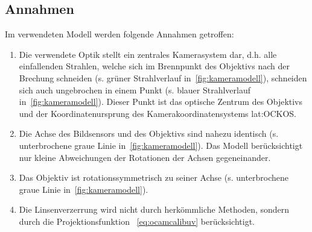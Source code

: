\subsection{Annahmen}
Im verwendeten Modell werden folgende Annahmen getroffen:
\begin{enumerate}
\item Die verwendete Optik stellt ein zentrales Kamerasystem dar, d.h. alle einfallenden Strahlen, welche sich im Brennpunkt des Objektivs nach der Brechung schneiden (s. grüner Strahlverlauf in~\ref{fig:kameramodell}), schneiden sich auch ungebrochen in einem Punkt (s. blauer Strahlverlauf in~\ref{fig:kameramodell}). Dieser Punkt ist das optische Zentrum des Objektivs und der Koordinatenursprung des Kamerakoordinatensystems \gls{lat:OCKOS}.
\item \label{item:ocamcalibassm2} Die Achse des Bildsensors und des Objektivs sind nahezu identisch (s. unterbrochene graue Linie in~\ref{fig:kameramodell}). Das Modell berücksichtigt nur kleine Abweichungen der Rotationen der Achsen gegeneinander.
\item Das Objektiv ist rotationssymmetrisch zu seiner Achse (s. unterbrochene graue Linie in~\ref{fig:kameramodell}).
\item Die Linsenverzerrung wird nicht durch herkömmliche Methoden, sondern durch die Projektionsfunktion ~\eqref{eq:ocamcalibuv} berücksichtigt.
\end{enumerate}

